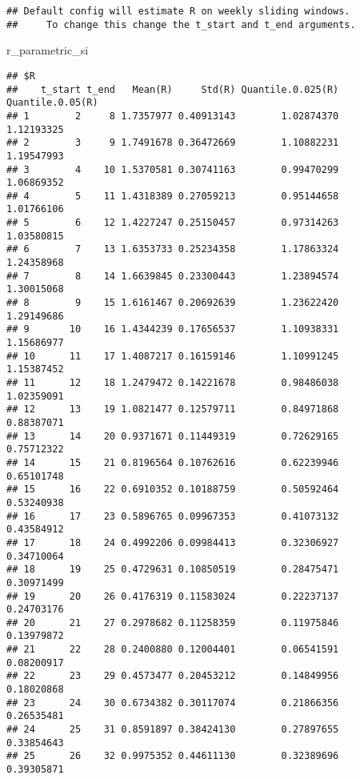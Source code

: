 \documentclass[
]{article}
\newenvironment{Shaded}{\begin{snugshade}}{\end{snugshade}}
\newcommand{\NormalTok}[1]{#1}
\begin{document}
\begin{verbatim}
## Default config will estimate R on weekly sliding windows.
##     To change this change the t_start and t_end arguments.
\end{verbatim}

\begin{Shaded}
\begin{Highlighting}[]
\NormalTok{r\_parametric\_si}
\end{Highlighting}
\end{Shaded}

\begin{verbatim}
## $R
##    t_start t_end   Mean(R)     Std(R) Quantile.0.025(R) Quantile.0.05(R)
## 1        2     8 1.7357977 0.40913143        1.02874370       1.12193325
## 2        3     9 1.7491678 0.36472669        1.10882231       1.19547993
## 3        4    10 1.5370581 0.30741163        0.99470299       1.06869352
## 4        5    11 1.4318389 0.27059213        0.95144658       1.01766106
## 5        6    12 1.4227247 0.25150457        0.97314263       1.03580815
## 6        7    13 1.6353733 0.25234358        1.17863324       1.24358968
## 7        8    14 1.6639845 0.23300443        1.23894574       1.30015068
## 8        9    15 1.6161467 0.20692639        1.23622420       1.29149686
## 9       10    16 1.4344239 0.17656537        1.10938331       1.15686977
## 10      11    17 1.4087217 0.16159146        1.10991245       1.15387452
## 11      12    18 1.2479472 0.14221678        0.98486038       1.02359091
## 12      13    19 1.0821477 0.12579711        0.84971868       0.88387071
## 13      14    20 0.9371671 0.11449319        0.72629165       0.75712322
## 14      15    21 0.8196564 0.10762616        0.62239946       0.65101748
## 15      16    22 0.6910352 0.10188759        0.50592464       0.53240938
## 16      17    23 0.5896765 0.09967353        0.41073132       0.43584912
## 17      18    24 0.4992206 0.09984413        0.32306927       0.34710064
## 18      19    25 0.4729631 0.10850519        0.28475471       0.30971499
## 19      20    26 0.4176319 0.11583024        0.22237137       0.24703176
## 20      21    27 0.2978682 0.11258359        0.11975846       0.13979872
## 21      22    28 0.2400880 0.12004401        0.06541591       0.08200917
## 22      23    29 0.4573477 0.20453212        0.14849956       0.18020868
## 23      24    30 0.6734382 0.30117074        0.21866356       0.26535481
## 24      25    31 0.8591897 0.38424130        0.27897655       0.33854643
## 25      26    32 0.9975352 0.44611130        0.32389696       0.39305871

\end{verbatim}
\end{document}
